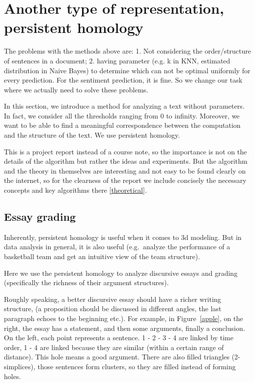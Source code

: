 \section{Another type of representation, persistent homology}

The problems with the methods above are: 1. Not considering the order/structure of sentences
in a document; 2. having parameter (e.g. k in KNN, estimated distribution in Naive Bayes) to determine which can not be optimal uniformly for
every prediction. For the sentiment prediction, it is fine. So we change our task 
where we actually need to solve these problems.

In this section, we introduce a method for analyzing a text
without parameters. In fact, we consider all
the thresholds ranging from 0 to infinity. Moreover, we want to be able to
find a meaningful correspondence between the computation and
the structure of the text. We use persistent homology.

This is a project report instead of a course note, so the importance
is not on the details of the algorithm but rather the ideas and experiments.
But the algorithm and the theory in themselves are interesting and not
easy to be found clearly on the internet, so for the clearness of the report
we include concisely the necessary
concepts and key algorithms there \ref{theoretical}.

\subsection{Essay grading}

Inherently, persistent homology is useful when it comes to 3d modeling.
But in data analysis in general, it is also useful (e.g.\ analyze the
performance of a basketball team and get an intuitive view of the team structure).

Here we use the persistent homology to analyze discursive essays and grading (specifically the
richness of their argument structures).

Roughly speaking, a better discursive essay should have a
richer writing structure, (a proposition should be discussed
in different angles, the last paragraph echoes to the beginning etc.).
For example,
in Figure~\ref{apple}, on the right, the essay has a statement, and then some arguments,
finally a conclusion.
On the left, each point represents a sentence.
1 - 2 - 3 - 4 are linked by time order, 1 - 4 are linked because they are similar (within a certain range of distance).
This hole means a good argument. There are also filled triangles (2-simplices), those
sentences form clusters, so they are filled instead of forming holes.

